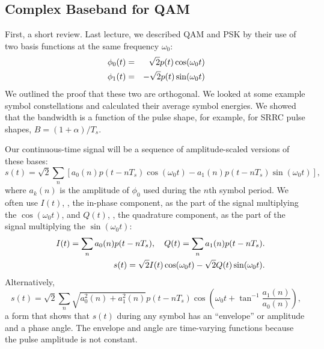 




\subsection{Complex Baseband for QAM}

First, a short review.  Last lecture, we described QAM and PSK by their use of two basis functions at the same frequency $\omega_0$:
\begin{eqnarray}
  \phi_0(t) &=& \sqrt{2} p(t) \cos(\omega_0 t) \nonumber \\ 
  \phi_1(t) &=& -\sqrt{2} p(t) \sin(\omega_0 t) \nonumber
\end{eqnarray}
We outlined the proof that these two are orthogonal.  We looked at some example symbol constellations and calculated their average symbol energies.  We showed that the bandwidth is a function of the pulse shape, for example, for SRRC pulse shapes, $B=(1+\alpha)/T_s$.

Our continuous-time signal will be a sequence of amplitude-scaled versions of these bases:
\begin{equation} \label{E:signal_QAM}
 s(t) = \sqrt{2} \sum_n \left[ a_0(n) p(t-nT_s) \cos(\omega_0 t) - a_1(n)  p(t-nT_s) \sin(\omega_0 t) \right],
\end{equation}
where $a_k(n)$ is the amplitude of $\phi_0$ used during the $n$th symbol period.  We often use $I(t)$, \ie, the in-phase component, as the part of the signal multiplying the $\cos(\omega_0 t)$, and $Q(t)$, \ie, the quadrature component, as the part of the signal multiplying the $\sin(\omega_0 t)$:
\begin{eqnarray}
 && I(t) = \sum_n a_0(n)p(t-nT_s), \quad Q(t) = \sum_n a_1(n)p(t-nT_s).\nonumber \\ 
 && s(t) = \sqrt{2}  I(t) \cos(\omega_0 t)  - \sqrt{2}  Q(t) \sin(\omega_0 t). \nonumber
\end{eqnarray}
Alternatively, 
\begin{equation} \label{E:signal_Angle}
 s(t) = \sqrt{2} \sum_n \sqrt{a_0^2(n) + a_1^2(n)} p(t-nT_s) \cos\left(\omega_0 t + \tan^{-1} \frac{a_1(n)}{a_0(n)} \right) ,
\end{equation}
a form that shows that $s(t)$ during any symbol has an ``envelope'' or amplitude and a phase angle.  The envelope and angle are time-varying functions because the pulse amplitude is not constant.  


